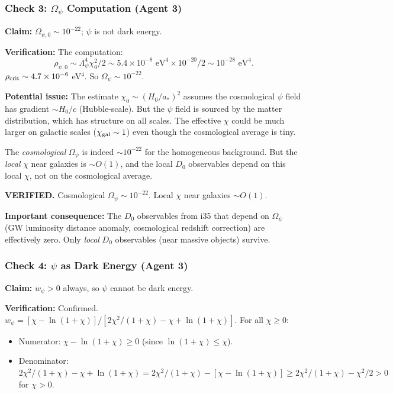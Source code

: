 \documentclass[11pt,a4paper]{article}
\begin{document}
\subsubsection{Check 3: $\Omega_\psi$ Computation (Agent 3)}

\textbf{Claim:} $\Omega_{\psi,0} \sim 10^{-22}$; $\psi$ is not dark energy.

\textbf{Verification:} The computation:
\begin{equation}
\rho_{\psi,0} \sim \Lambda_\psi^4 \chi_0^2/2 \sim 5.4\times10^{-8}\text{ eV}^4 \times 10^{-20}/2 \sim 10^{-28}\text{ eV}^4.
\end{equation}
$\rho_{\rm crit} \sim 4.7\times10^{-6}$ eV$^4$. So $\Omega_\psi \sim 10^{-22}$.

\textbf{Potential issue:} The estimate $\chi_0 \sim (H_0/a_*)^2$ assumes the cosmological $\psi$ field has gradient $\sim H_0/c$ (Hubble-scale). But the $\psi$ field is sourced by the matter distribution, which has structure on all scales. The effective $\chi$ could be much larger on galactic scales ($\chi_{\rm gal} \sim 1$) even though the cosmological average is tiny.

The \emph{cosmological} $\Omega_\psi$ is indeed $\sim 10^{-22}$ for the homogeneous background. But the \emph{local} $\chi$ near galaxies is $\sim O(1)$, and the local $D_0$ observables depend on this local $\chi$, not on the cosmological average.

\textcolor{dfdgreen}{\textbf{VERIFIED.}} Cosmological $\Omega_\psi \sim 10^{-22}$. Local $\chi$ near galaxies $\sim O(1)$.

\textbf{Important consequence:} The $D_0$ observables from i35 that depend on $\Omega_\psi$ (GW luminosity distance anomaly, cosmological redshift correction) are effectively zero. Only \emph{local} $D_0$ observables (near massive objects) survive.

\subsubsection{Check 4: $\psi$ as Dark Energy (Agent 3)}

\textbf{Claim:} $w_\psi > 0$ always, so $\psi$ cannot be dark energy.

\textbf{Verification:} Confirmed. $w_\psi = [\chi - \ln(1+\chi)]/[2\chi^2/(1+\chi) - \chi + \ln(1+\chi)]$. For all $\chi \geq 0$:
\begin{itemize}
\item Numerator: $\chi - \ln(1+\chi) \geq 0$ (since $\ln(1+\chi) \leq \chi$).
\item Denominator: $2\chi^2/(1+\chi) - \chi + \ln(1+\chi) = 2\chi^2/(1+\chi) - [\chi - \ln(1+\chi)] \geq 2\chi^2/(1+\chi) - \chi^2/2 > 0$ for $\chi > 0$.
\end{itemize}
\end{document}
